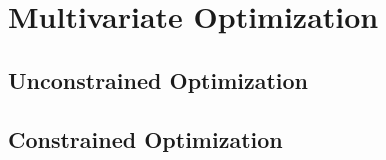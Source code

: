 \section{Multivariate Optimization} 

\subsection{Unconstrained Optimization} 

\subsection{Constrained Optimization} 

\begin{comment}

-unconstrained (gradient must be zero)
-constrained (Lagrange multipliers)
-maybe constrained linear optimization (simplex algorithm)
-maybe numerics (gradient descent and co.)...maybe numerical methods should generally be embedded in the respective topics?

\end{comment} 
